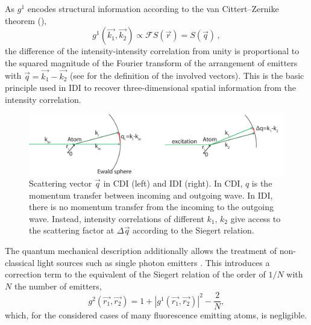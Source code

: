 As $g^1$ encodes structural information according to the van Cittert–Zernike theorem (),
\begin{equation}
	g^1(\vec{k_1},\vec{k_2}) \propto \mathscr{F}S(\vec{r}) = S(\vec{q}) \,,
\end{equation}
the difference of the intensity-intensity correlation from unity is proportional to the squared magnitude of the Fourier transform of the arrangement of emitters with $\vec{q}=\vec{k_1}-\vec{k_2}$ (see  for the definition of the involved vectors). 
This is the basic principle used in IDI to recover three-dimensional spatial information from the intensity correlation.
\begin{figure}
	\centering
	\includegraphics[width=0.9\linewidth]{images/scatteringvectors.pdf}
	\caption[Scattering vectors]{Scattering vector $\vec{q}$ in CDI (left) and IDI (right). In CDI, $q$ is the momentum transfer between incoming and outgoing wave. In IDI, there is no momentum transfer from the incoming to the outgoing wave. Instead, intensity correlations of different $k_1$, $k_2$ give access to the scattering factor at $\Delta\vec{q}$ according to the Siegert relation.}
	\label{fig:scatteringvectors}
\end{figure}

 The quantum mechanical description additionally allows the treatment of non-classical light sources such as single photon emitters \cite{mandel1995,classen2017}. This introduces a correction term to the equivalent of the Siegert relation of the order of $1/N$ with $N$ the number of emitters,
\begin{equation}
	g^2(\vec{r_1},\vec{r_2}) = 1+ |g^1(\vec{r_1},\vec{r_2}) |^2 - \frac{2}{N} ,
\end{equation}
which, for the considered cases of many fluorescence emitting atoms, is negligible.



